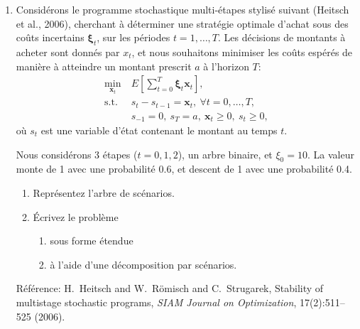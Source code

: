 \documentclass[12pt]{book}
\def\bx {\boldsymbol{x}}
\def\bxi {\boldsymbol{\xi}}
\newcounter {exercisecount}[section]
\newenvironment {exercise}{}{}%
\begin{document}
\begin{enumerate}
\item
\begin{exercise}
	Considérons le programme stochastique multi-étapes stylisé suivant (Heitsch et al., 2006),
	cherchant à déterminer une stratégie optimale d'achat sous des coûts incertains $\bxi_t$,
	sur les périodes $t = 1,\ldots,T$. Les décisions de montants à acheter sont donnés par $x_t$,
	et nous souhaitons minimiser les coûts espérés de manière à atteindre un montant prescrit
	$a$ à l'horizon $T$:
	\begin{align*}
	\min_{\bx_t}\ & E\left[ \sum_{t=0}^T \bxi_t \bx_t \right],\\
	\mbox{s.t. } & s_t-s_{t-1} = \bx_t,\ \forall t = 0,\ldots,T,\\
	& s_{-1} = 0,\ s_T = a,\ \bx_t \geq 0,\ s_t \geq 0,
	\end{align*}
	où $s_t$ est une variable d'état  contenant le montant au temps $t$.
	
	Nous considérons 3 étapes ($t = 0, 1, 2$), un arbre binaire, et $\xi_0 = 10$.
	La valeur monte de 1 avec une probabilité 0.6, et descent de 1 avec une probabilité 0.4.
	
	\begin{enumerate}
		\item 
		Représentez l'arbre de scénarios.
		\item
		Écrivez le problème
		\begin{enumerate}
			\item
			sous forme étendue
			\item
			à l'aide d'une décomposition par scénarios.
		\end{enumerate}
	\end{enumerate}
	
	
	{\small Référence:
		H.~Heitsch and W.~Römisch and C.~Strugarek, Stability of multistage stochastic
		programs, {\em SIAM Journal on Optimization}, 17(2):511--525 (2006).
	}
	
\end{exercise}

\begin{center}
{
\pstree[treemode=R,levelsep=22ex]{\Tcircle{$\xi_0 = 10$}}{
\pstree{\Tcircle{$\xi_1 = 9$}
\ncput{0.4}}
{\Tcircle{$\xi_2 = 8$}
\trput{0.4}
\Tcircle{$\xi_2 = 10$}
\trput{0.6}
}
\pstree{\Tcircle{$\xi_1 = 11$}\ncput{0.6}}
{
\Tcircle{$\xi_2 = 10$}%
\trput{0.4}
\Tcircle{$\xi_2 = 12$}%
\trput{0.6}}
}
}
\end{center}


\end{enumerate}
\end{document}
